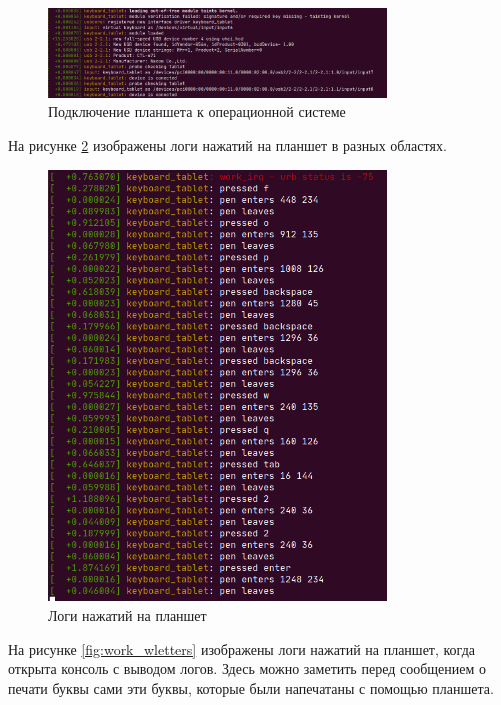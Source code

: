 \begin{figure}[H]
    \centering
    \includegraphics[width=0.8\textwidth]{img/connect.png}
    \caption{Подключение планшета к операционной системе}
    \label{fig:connect}
\end{figure}

На рисунке \ref{fig:work} изображены логи нажатий на планшет в разных областях.

\begin{figure}[H]
    \centering
    \includegraphics[width=0.8\textwidth]{img/work.png}
    \caption{Логи нажатий на планшет}
    \label{fig:work}
\end{figure}

На рисунке \ref{fig:work_wletters} изображены логи нажатий на планшет, когда открыта консоль с выводом логов. Здесь можно заметить перед сообщением о печати буквы сами эти буквы, которые были напечатаны с помощью планшета.

